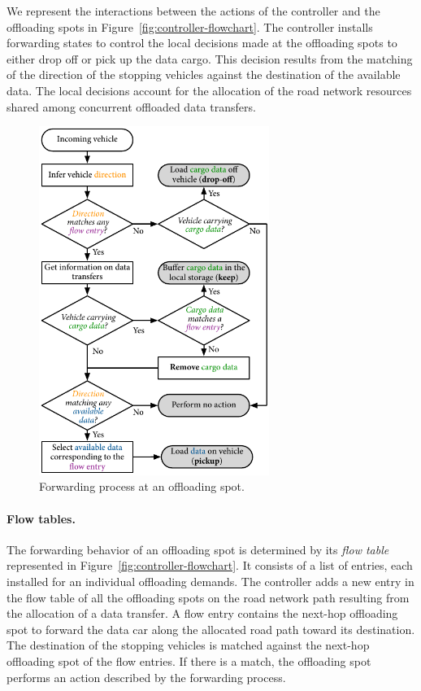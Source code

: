 We represent the interactions between the actions of the controller and the offloading spots in Figure~\ref{fig:controller-flowchart}. The controller installs forwarding states to control the local decisions made at the offloading spots to either drop off or pick up the data cargo. This decision results from the matching of the direction of the stopping vehicles against the destination of the available data. The local decisions account for the allocation of the road network resources shared among concurrent offloaded data transfers.

\begin{figure}
    \includegraphics[width=7.5cm]{figures/forwarding.pdf}
    \caption{Forwarding process at an offloading spot.}
    \label{fig:forwarding-process}
\end{figure}
\paragraph{Flow tables.} 
The forwarding behavior of an offloading spot is determined by its \textit{flow table} represented in Figure~\ref{fig:controller-flowchart}. It consists of a list of entries, each installed for an individual offloading demands. The controller adds a new entry in the flow table of all the offloading spots on the road network path resulting from the allocation of a data transfer.
A flow entry contains the next-hop offloading spot to forward the data car along the allocated road path toward its destination.
The destination of the stopping vehicles is matched against the next-hop offloading spot of the flow entries. If there is a match, the offloading spot performs an action described by the forwarding process.

